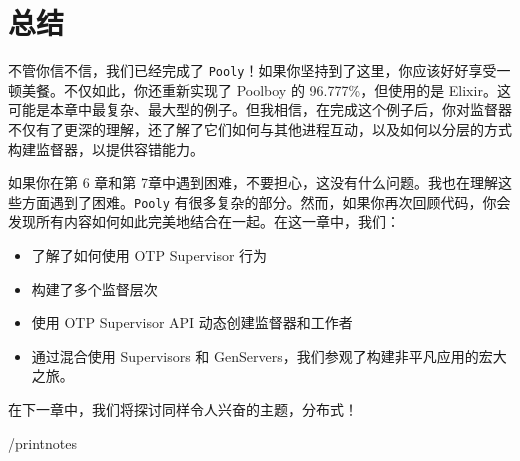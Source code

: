  \section{总结}

不管你信不信，我们已经完成了
\texttt{Pooly}！如果你坚持到了这里，你应该好好享受一顿美餐。不仅如此，你还重新实现了
Poolboy 的 96.777\%，但使用的是
Elixir。这可能是本章中最复杂、最大型的例子。但我相信，在完成这个例子后，你对监督器不仅有了更深的理解，还了解了它们如何与其他进程互动，以及如何以分层的方式构建监督器，以提供容错能力。

如果你在第 6 章和第 7章中遇到困难，不要担心，这没有什么问题。我也在理解这些方面遇到了困难。\texttt{Pooly}
有很多复杂的部分。然而，如果你再次回顾代码，你会发现所有内容如何如此完美地结合在一起。在这一章中，我们：

\begin{itemize}

\item
  了解了如何使用 OTP Supervisor 行为
\item
  构建了多个监督层次
\item
  使用 OTP Supervisor API 动态创建监督器和工作者
\item
  通过混合使用 Supervisors 和
  GenServers，我们参观了构建非平凡应用的宏大之旅。
\end{itemize}

在下一章中，我们将探讨同样令人兴奋的主题，分布式！


/printnotes

